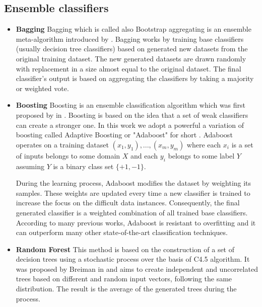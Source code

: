 \documentclass[a4paper,10pt,onecolumn,preprint,3p]{elsarticle}
\begin{document}
\subsection{Ensemble classifiers}
\label{subsec:ensembles}

\begin{itemize}
\item \textbf{Bagging} 
Bagging which is called also Bootstrap aggregating is an ensemble meta-algorithm introduced by \citet{B1996}. Bagging works by training base classifiers (usually decision tree classifiers) based on generated new datasets from the original training dataset. The new generated datasets are drawn randomly with replacement in a size almost equal to the original dataset. The final classifier's output is based on aggregating the classifiers by taking a majority or weighted vote.


\item \textbf{Boosting} 
Boosting is an ensemble classification algorithm which was first proposed by \citet{schapire1990strength} in \citet{schapire1990strength}. Boosting is based on the idea that a set of weak classifiers can create a stronger one. In this work we adopt a powerful a variation of boosting called Adaptive Boosting or "Adaboost" for short \cite{FS1997}. Adaboost operates on a training dataset ${(x_{1},y_{1}),...,(x_{m},y_{m})}$ where each $x_{i}$ is a set of inputs belongs to some domain $X$ and each $y_{i}$ belongs to some label $Y$ assuming $Y$ is a binary class set $\{+1,-1\}$. 


During the learning process, Adaboost modifies the dataset by weighting its samples. These weights are updated every time a new classifier is trained to increase the focus on the difficult data instances. Consequently, the final generated classifier is a weighted combination of all trained base classifiers. According to many previous works, Adaboost is resistant to overfitting and it can outperform many other state-of-the-art classification techniques.


\item \textbf{Random Forest}
This method is based on the construction of a set of decision trees using a stochastic process over the basis of C4.5 algorithm. It was proposed by Breiman in \cite{Breiman2001} and aims to create independent and uncorrelated trees based on different and random input vectors, following the same distribution. 
The result is the average of the generated trees during the process.
\end{itemize}
\end{document}
